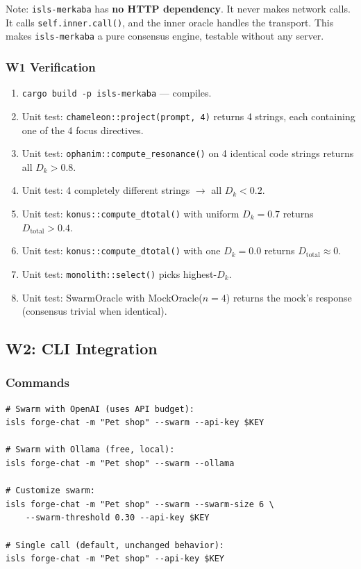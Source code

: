 \documentclass[11pt,a4paper]{article}
\begin{document}
Note: \texttt{isls-merkaba} has \textbf{no HTTP dependency}. 
It never makes network calls. It calls \texttt{self.inner.call()}, 
and the inner oracle handles the transport. This makes 
\texttt{isls-merkaba} a pure consensus engine, testable 
without any server.

\subsubsection{W1 Verification}

\begin{enumerate}[nosep]
\item \texttt{cargo build -p isls-merkaba} --- compiles.
\item Unit test: \texttt{chameleon::project(prompt, 4)} returns 
      4 strings, each containing one of the 4 focus directives.
\item Unit test: \texttt{ophanim::compute\_resonance()} on 4 
      identical code strings returns all $D_k > 0.8$.
\item Unit test: 4 completely different strings $\to$ all 
      $D_k < 0.2$.
\item Unit test: \texttt{konus::compute\_dtotal()} with uniform 
      $D_k = 0.7$ returns $D_\text{total} > 0.4$.
\item Unit test: \texttt{konus::compute\_dtotal()} with one 
      $D_k = 0.0$ returns $D_\text{total} \approx 0$.
\item Unit test: \texttt{monolith::select()} picks highest-$D_k$.
\item Unit test: SwarmOracle with MockOracle($n=4$) returns 
      the mock's response (consensus trivial when identical).
\end{enumerate}


\subsection{W2: CLI Integration}

\subsubsection{Commands}

\begin{lstlisting}[style=bash]
# Swarm with OpenAI (uses API budget):
isls forge-chat -m "Pet shop" --swarm --api-key $KEY

# Swarm with Ollama (free, local):
isls forge-chat -m "Pet shop" --swarm --ollama

# Customize swarm:
isls forge-chat -m "Pet shop" --swarm --swarm-size 6 \
    --swarm-threshold 0.30 --api-key $KEY

# Single call (default, unchanged behavior):
isls forge-chat -m "Pet shop" --api-key $KEY
\end{lstlisting}
\end{document}
